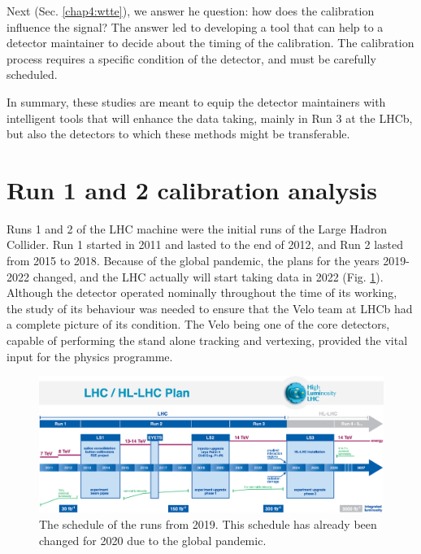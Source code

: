 Next (Sec. \ref{chap4:wtte}), we answer he question: how does the calibration influence the signal? The answer led to developing a tool that can help to a detector maintainer to decide about the timing of the calibration.
The calibration process requires a specific condition of the detector, and must be carefully scheduled.

In summary, these studies are meant to equip the detector maintainers with intelligent tools that will enhance the data taking, mainly in Run 3 at the LHCb, but also the detectors to which these methods might be transferable.





\section{Run 1 and 2 calibration analysis}
\label{chap4:run12}

Runs 1 and 2 of the LHC machine were the initial runs of the Large Hadron Collider. Run 1 started in 2011 and lasted to the end of 2012, and Run 2 lasted from 2015 to 2018\cite{Hoecker:2236645}.
Because of the global pandemic, the plans for the years 2019-2022 changed, and the LHC actually will start taking data in 2022 (Fig. \ref{plot:lhc_schedule}).
Although the detector operated nominally throughout the time of its working, the study of its behaviour was needed to ensure that the Velo team at LHCb had a complete picture of its condition. The Velo being one of the core detectors, capable of performing the stand alone tracking and vertexing, provided the vital input for the physics programme.

\begin{figure}
    \centering
    \includegraphics[width=0.9\linewidth]{figures/chapter4/lhc_schedule.png}
    \caption{The schedule of the runs from 2019. This schedule has already been changed for 2020 due to the global pandemic.}
    \label{plot:lhc_schedule}
\end{figure}


